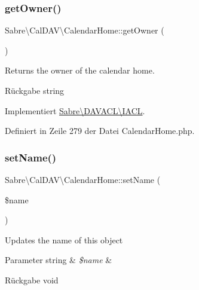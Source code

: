 \mbox{\label{class_sabre_1_1_cal_d_a_v_1_1_calendar_home_aea7f05be2069407a39e6ec0cf444f6d9}} 
\subsubsection{\texorpdfstring{get\+Owner()}{getOwner()}}
{\footnotesize\ttfamily Sabre\textbackslash{}\+Cal\+D\+A\+V\textbackslash{}\+Calendar\+Home\+::get\+Owner (\begin{DoxyParamCaption}{ }\end{DoxyParamCaption})}

Returns the owner of the calendar home.

\begin{DoxyReturn}{Rückgabe}
string 
\end{DoxyReturn}


Implementiert \mbox{\hyperlink{interface_sabre_1_1_d_a_v_a_c_l_1_1_i_a_c_l_a05f531b4ae1a86eab4e6e95b0413390e}{Sabre\textbackslash{}\+D\+A\+V\+A\+C\+L\textbackslash{}\+I\+A\+CL}}.



Definiert in Zeile 279 der Datei Calendar\+Home.\+php.

\mbox{\label{class_sabre_1_1_cal_d_a_v_1_1_calendar_home_aaa0c4f3c31b554595466644949399be0}} 
\subsubsection{\texorpdfstring{set\+Name()}{setName()}}
{\footnotesize\ttfamily Sabre\textbackslash{}\+Cal\+D\+A\+V\textbackslash{}\+Calendar\+Home\+::set\+Name (\begin{DoxyParamCaption}\item[{}]{\$name }\end{DoxyParamCaption})}

Updates the name of this object


\begin{DoxyParams}[1]{Parameter}
string & {\em \$name} & \\
\hline
\end{DoxyParams}
\begin{DoxyReturn}{Rückgabe}
void 
\end{DoxyReturn}


